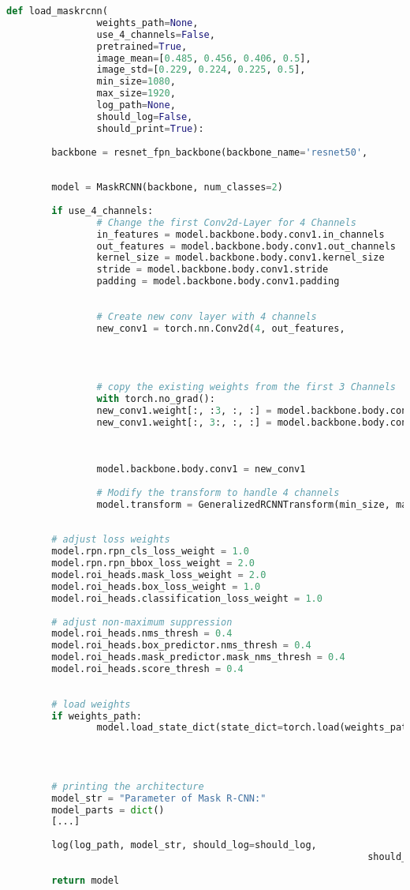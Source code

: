 		\begin{lstlisting}[language=Python,caption=Loading function of Mask R-CNN using torchvision, label=lst:model-loading]
def load_maskrcnn(
				weights_path=None, 
				use_4_channels=False, 
				pretrained=True,
				image_mean=[0.485, 0.456, 0.406, 0.5], 
				image_std=[0.229, 0.224, 0.225, 0.5],    
				min_size=1080, 
				max_size=1920, 
				log_path=None, 
				should_log=False, 
				should_print=True):
		
		backbone = resnet_fpn_backbone(backbone_name='resnet50',
																			weights=ResNet50_Weights.IMAGENET1K_V2
																			) 
		model = MaskRCNN(backbone, num_classes=2)  
		
		if use_4_channels:
				# Change the first Conv2d-Layer for 4 Channels
				in_features = model.backbone.body.conv1.in_channels    
				out_features = model.backbone.body.conv1.out_channels
				kernel_size = model.backbone.body.conv1.kernel_size
				stride = model.backbone.body.conv1.stride
				padding = model.backbone.body.conv1.padding
				
				
				# Create new conv layer with 4 channels
				new_conv1 = torch.nn.Conv2d(4, out_features,
																				kernel_size=kernel_size, 
																				stride=stride, 
																				padding=padding)
				
				# copy the existing weights from the first 3 Channels
				with torch.no_grad():
				new_conv1.weight[:, :3, :, :] = model.backbone.body.conv1.weight  # Copy old 3 Channels
				new_conv1.weight[:, 3:, :, :] = model.backbone.body.conv1.weight
																														[:, :1, :, :]
				
				
				model.backbone.body.conv1 = new_conv1
				
				# Modify the transform to handle 4 channels
				model.transform = GeneralizedRCNNTransform(min_size, max_size, 
																										image_mean, image_std)
		
		# adjust loss weights
		model.rpn.rpn_cls_loss_weight = 1.0
		model.rpn.rpn_bbox_loss_weight = 2.0
		model.roi_heads.mask_loss_weight = 2.0
		model.roi_heads.box_loss_weight = 1.0
		model.roi_heads.classification_loss_weight = 1.0
		
		# adjust non-maximum suppression
		model.roi_heads.nms_thresh = 0.4
		model.roi_heads.box_predictor.nms_thresh = 0.4  
		model.roi_heads.mask_predictor.mask_nms_thresh = 0.4
		model.roi_heads.score_thresh = 0.4
		
		
		# load weights
		if weights_path:
				model.load_state_dict(state_dict=torch.load(weights_path, 
																												weights_only=True)) 
		
		
		
		# printing the architecture
		model_str = "Parameter of Mask R-CNN:"
		model_parts = dict()
		[...]
		
		log(log_path, model_str, should_log=should_log, 
																should_print=should_print)
		
		return model
		\end{lstlisting}
		

